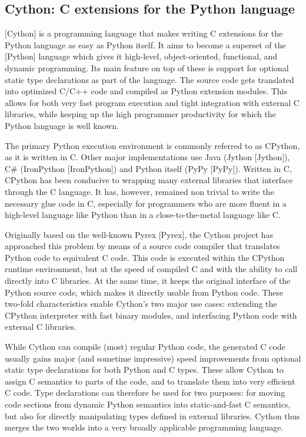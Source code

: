 \newpage
\subsection{Cython: C extensions for the Python language}

[Cython] is a programming language that makes writing C extensions for the Python language as easy as Python itself. It aims to become a superset of the [Python] language which gives it high-level, object-oriented, functional, and dynamic programming. Its main feature on top of these is support for optional static type declarations as part of the language. The source code gets translated into optimized C/C++ code and compiled as Python extension modules. This allows for both very fast program execution and tight integration with external C libraries, while keeping up the high programmer productivity for which the Python language is well known.

The primary Python execution environment is commonly referred to as CPython, as it is written in C. Other major implementations use Java (Jython [Jython]), C\# (IronPython [IronPython]) and Python itself (PyPy [PyPy]). Written in C, CPython has been conducive to wrapping many external libraries that interface through the C language. It has, however, remained non trivial to write the necessary glue code in C, especially for programmers who are more fluent in a high-level language like Python than in a close-to-the-metal language like C.

Originally based on the well-known Pyrex [Pyrex], the Cython project has approached this problem by means of a source code compiler that translates Python code to equivalent C code. This code is executed within the CPython runtime environment, but at the speed of compiled C and with the ability to call directly into C libraries. At the same time, it keeps the original interface of the Python source code, which makes it directly usable from Python code. These two-fold characteristics enable Cython’s two major use cases: extending the CPython interpreter with fast binary modules, and interfacing Python code with external C libraries.

While Cython can compile (most) regular Python code, the generated C code usually gains major (and sometime impressive) speed improvements from optional static type declarations for both Python and C types. These allow Cython to assign C semantics to parts of the code, and to translate them into very efficient C code. Type declarations can therefore be used for two purposes: for moving code sections from dynamic Python semantics into static-and-fast C semantics, but also for directly manipulating types defined in external libraries. Cython thus merges the two worlds into a very broadly applicable programming language.



